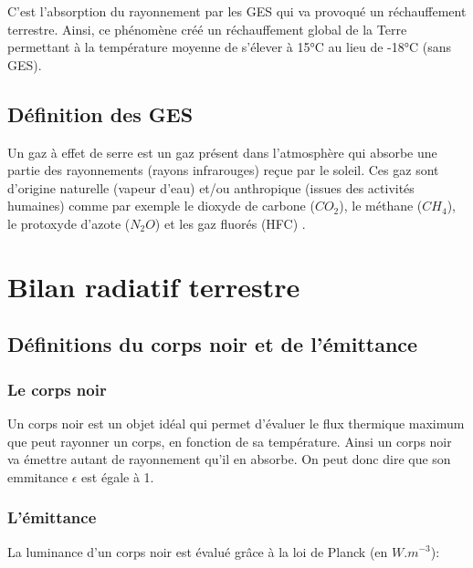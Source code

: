 \documentclass[a4paper, 12pt]{report} %
\begin{document}
	C'est l'absorption du rayonnement par les GES qui va 
provoqué un réchauffement terrestre. Ainsi, ce phénomène 
créé un réchauffement global de la Terre permettant à la 
température moyenne de s'élever à 15°C au lieu de -18°C 
(sans GES). 

\subsection{Définition des GES}
Un gaz à effet de serre est un gaz présent dans l'atmosphère qui 
absorbe une partie des rayonnements (rayons infrarouges) 
reçue par le soleil. Ces gaz sont d'origine naturelle 
(vapeur d'eau) et/ou anthropique 
(issues des activités humaines) comme par exemple le dioxyde 
de carbone ($CO_2$), le méthane ($CH_4$), le protoxyde d'azote
($N_2O$) et les gaz fluorés (HFC) . \vspace{\baselineskip}


\section{Bilan radiatif terrestre}
\subsection{Définitions du corps noir et de l'émittance}

\subsubsection{Le corps noir}
Un corps noir est un objet idéal qui permet d'évaluer le flux thermique maximum
que peut rayonner un corps, en fonction de sa température. Ainsi un corps noir 
va émettre autant de rayonnement qu'il en absorbe. On peut donc dire que son 
emmitance $ \epsilon$  est égale à 1. 

\subsubsection{L'émittance} 

La luminance d'un corps noir est évalué grâce à la loi de Planck 
(en $W.m^{-3}$): \vspace{\baselineskip}
\end{document}
